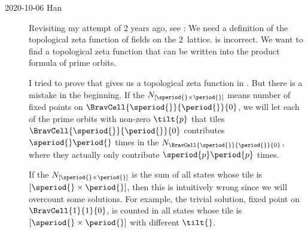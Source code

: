 \begin{description}
    \item[2020-10-06 Han]
Revisiting my attempt of 2 years ago, see :
We need a definition of the topological zeta function of fields on the 2\dmn\ lattice.
 is incorrect. We want to find a topological zeta function
that can be written into the product formula of prime orbits.

I tried to prove that  gives us a topological
zeta function in . But there is a
mistake in the beginning. If the $N_{[\speriod{}\times\period{}]}$ means number of fixed points on
$\BravCell{\speriod{}}{\period{}}{0}$, we will let each of the prime orbits  with non-zero
$\tilt{p}$ that tiles
$\BravCell{\speriod{}}{\period{}}{0}$ contributes ${\speriod{}}{\period{}}$ times in the
$N_\BravCell{\speriod{}}{\period{}}{0}$, where they actually only contribute ${\speriod{p}}{\period{p}}$ times.

If the $N_{[\speriod{}\times\period{}]}$ is the sum of all states whose tile is $[\speriod{}\times\period{}]$, then
this is intuitively wrong since we will overcount some solutions. For example, the trivial solution, fixed
point on $\BravCell{1}{1}{0}$, is counted in all states whose tile is $[\speriod{}\times\period{}]$ with different
$\tilt{}$.


\end{description}
